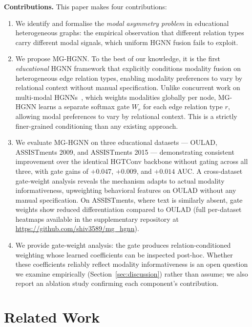 \documentclass[sigconf,review]{acmart}
\begin{document}
\textbf{Contributions.} This paper makes four
contributions:
\begin{enumerate}
  \item We identify and formalise the \emph{modal
  asymmetry problem} in educational heterogeneous
  graphs: the empirical observation that different
  relation types carry different modal signals, which
  uniform HGNN fusion fails to exploit.
  \item We propose MG-HGNN. To the best of our
  knowledge, it is the first \emph{educational} HGNN
  framework that explicitly conditions modality fusion
  on heterogeneous edge relation types, enabling
  modality preferences to vary by relational context
  without manual specification. Unlike concurrent
  work on multi-modal HGNNs~\citep{bachiri2025mmhgnn},
  which weights modalities globally per node, MG-HGNN
  learns a separate softmax gate $W_r$ for each edge
  relation type $r$, allowing modal preferences to vary
  by relational context. This is a strictly
  finer-grained conditioning than any existing approach.
  \item We evaluate MG-HGNN on three educational
  datasets --- OULAD, ASSISTments 2009, and
  ASSISTments 2015 --- demonstrating consistent
  improvement over the identical HGTConv backbone
  without gating across all three, with gate gains
  of $+0.047$, $+0.009$, and $+0.014$ AUC. A
  cross-dataset gate-weight analysis reveals the
  mechanism adapts to actual modality informativeness,
  upweighting behavioral features on OULAD without any
  manual specification. On ASSISTments, where text is
  similarly absent, gate weights show reduced
  differentiation compared to OULAD (full per-dataset
  heatmaps available in the supplementary repository at
  \url{https://github.com/shiv3589/mg_hgnn}).
  \item We provide gate-weight analysis: the gate
  produces relation-conditioned weighting whose learned
  coefficients can be inspected post-hoc. Whether these
  coefficients reliably reflect modality informativeness
  is an open question we examine empirically
  (Section~\ref{sec:discussion}) rather than assume; we
  also report an ablation study confirming each
  component's contribution.
\end{enumerate}

\section{Related Work}
\label{sec:related}
\end{document}

